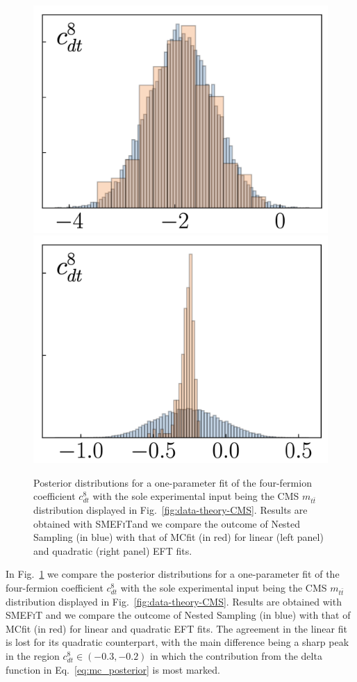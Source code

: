 \documentclass[withindex,glossary]{cam-thesis}
\newcommand{\smefit}{\textsc{SMEFiT}}
\begin{document}
\begin{figure}[H]
        \centering
        \includegraphics[width=0.49\linewidth]{smeft_plots/linear_O8dt.png}
        \includegraphics[width=0.49\linewidth]{smeft_plots/quadratic_O8dt.png}
        \caption{Posterior distributions for a one-parameter fit
          of the four-fermion coefficient $c_{dt}^8$ with the sole experimental
          input being the CMS $m_{t\bar{t}}$ distribution
          displayed in Fig.~\ref{fig:data-theory-CMS}.
          Results are obtained with \smefit and we compare the outcome of Nested Sampling (in blue) with
          that of MCfit (in red)
          for linear (left panel) and quadratic (right panel) EFT fits.
        }
    \label{fig:O8dt-fit}
\end{figure}

In Fig.~\ref{fig:O8dt-fit} we
compare the posterior distributions for a one-parameter fit
of the four-fermion coefficient $c_{dt}^8$ with the sole experimental
input being the CMS $m_{t\bar{t}}$ distribution
displayed in Fig.~\ref{fig:data-theory-CMS}.
%
Results are obtained with \smefit{} and we compare the outcome of Nested Sampling (in blue) with
that of MCfit (in red)
for linear and quadratic  EFT fits.
%
The agreement in the linear fit is lost for its quadratic counterpart,
with the main difference being a sharp peak in the region
$c_{dt}^8 \in (-0.3,-0.2)$ in which the contribution
from the delta function in Eq.~\ref{eq:mc_posterior} is most
marked.
\end{document}
